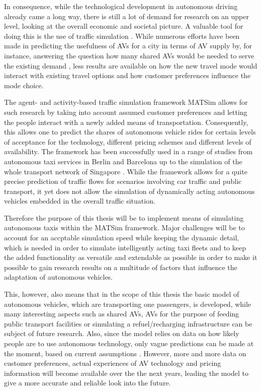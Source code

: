In consequence, while the technological development in autonomous driving already
came a long way, there is still a lot of demand for research on an upper level, looking
at the overall economic and societal picture. A valuable tool for doing this is the
use of traffic simulation \citep{Fagnant2014, ITF2014}. While numerous efforts have been made
in predicting the usefulness of AVs for a city in terms of AV supply by, for
instance, answering the question how many shared AVs would be needed to serve the
existing demand \citep{Bosch2015}, less results are available on how the new travel
mode would interact with existing travel options and how customer preferences
influence the mode choice.

The agent- and activity-based traffic simulation framework MATSim \citep{Horni2015} allows for such
research \citep{Boesch2015} by taking into account assumed customer preferences and letting the people
interact with a newly added means of transportation. Consequently, this allows one
to predict the shares of autonomous vehicle rides for certain levels of acceptance
for the technology, different pricing schemes and different levels of availability.
The framework has been successfully used in a range of studies from autonomous taxi services
in Berlin and Barcelona \citep{Bischoff2016} up to the simulation of the whole transport network of
Singapore \citep{Erath2014}. While the framework allows for a quite precise prediction of traffic
flows for scenarios involving car traffic and public transport, it yet does not
allow the simulation of dynamically acting autonomous vehicles embedded in the
overall traffic situation.

Therefore the purpose of this thesis will be to implement means of simulating autonomous
taxis within the MATSim framework. Major challenges will be to account for an
accptable simulation speed while keeping the dynamic detail, which is needed in
order to simulate intelligently acting taxi fleets and to keep the added functionality
as versatile and extendable as possible in order to make it possible to gain
research results on a multitude of factors that influence the adaptation of
autonomous vehicles.

This, however, also means that in the scope of this thesis the basic model of
autonomous vehicles, which are transporting one passengers, is developed, while
many interesting aspects such as shared AVs, AVs for the purpose of feeding
public transport facilities or simulating a refuel/recharging infrastructure can
be subject of future research. Also, since the model relies on data on how likely
people are to use autonomous technology, only vague predictions can be made at
the moment, based on current assumptions \citep{Silberg2013, SchoettleBrandon2014}.
However, more and more data on customer preferences, actual experiences of AV technology and pricing information will
become available over the the next years, leading the model to give a more accurate
and reliable look into the future.


